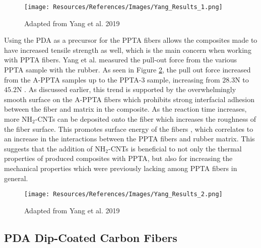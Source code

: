 \documentclass[12pt]{article}
\begin{document}
\begin{multicols}{2}
\begin{figure}[H]
    \centering
    \texttt{[image: Resources/References/Images/Yang\_Results\_1.png]}
    \caption{\scriptsize{Adapted from Yang et al. 2019 \citep{Yang2019}}}
    \label{fig:Yang_Results_1}
\end{figure}

\indent Using the PDA as a precursor for the PPTA fibers allows the composites made to have increased tensile strength as well, which is the main concern when working with PPTA fibers. Yang et al. \citep{Yang2019} measured the pull-out force from the various PPTA sample with the rubber. As seen in Figure \ref{fig:Yang_Results_2}, the pull out force increased from the A-PPTA samples up to the PPTA-3 sample, increasing from $28.3$N to $45.2$N \citep{Yang2019}. As discussed earlier, this trend is supported by the overwhelmingly smooth surface on the A-PPTA fibers which prohibits strong interfacial adhesion between the fiber and matrix in the composite. As the reaction time increases, more NH$_2$-CNTs can be deposited onto the fiber which increases the roughness of the fiber surface. This promotes surface energy of the fibers \citep{Yang2019}, which correlates to an increase in the interactions between the PPTA fibers and rubber matrix. This suggests that the addition of NH$_2$-CNTs is beneficial to not only the thermal properties of produced composites with PPTA, but also for increasing the mechanical properties which were previously lacking among PPTA fibers in general.

\begin{figure}[H]
    \centering
    \texttt{[image: Resources/References/Images/Yang\_Results\_2.png]}
    \caption{\scriptsize{Adapted from Yang et al. 2019 \citep{Yang2019}}}
    \label{fig:Yang_Results_2}
\end{figure}

\subsection{PDA Dip-Coated Carbon Fibers}


\end{multicols}
\end{document}
